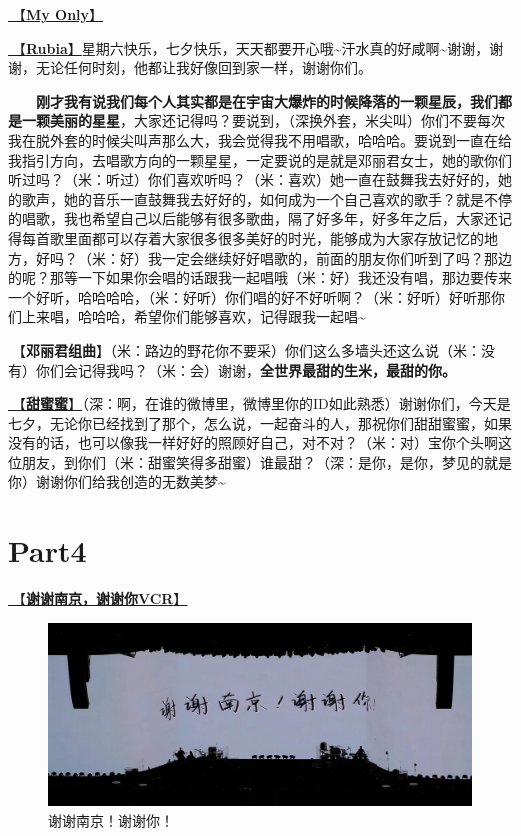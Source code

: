 \documentclass[]{ctexbook}
\begin{document}
\hyperref[my-only]{🎵【\textbf{My Only}】}

\hyperref[rubia]{🎵【\textbf{Rubia}】}星期六快乐，七夕快乐，天天都要开心哦\textasciitilde 汗水真的好咸啊\textasciitilde 谢谢，谢谢，无论任何时刻，他都让我好像回到家一样，谢谢你们。

  \textbf{刚才我有说我们每个人其实都是在宇宙大爆炸的时候降落的一颗星辰，我们都是一颗美丽的星星}，大家还记得吗？要说到，（深换外套，米尖叫）你们不要每次我在脱外套的时候尖叫声那么大，我会觉得我不用唱歌，哈哈哈。要说到一直在给我指引方向，去唱歌方向的一颗星星，一定要说的是就是邓丽君女士，她的歌你们听过吗？（米：听过）你们喜欢听吗？（米：喜欢）她一直在鼓舞我去好好的，她的歌声，她的音乐一直鼓舞我去好好的，如何成为一个自己喜欢的歌手？就是不停的唱歌，我也希望自己以后能够有很多歌曲，隔了好多年，好多年之后，大家还记得每首歌里面都可以存着大家很多很多美好的时光，能够成为大家存放记忆的地方，好吗？（米：好）我一定会继续好好唱歌的，前面的朋友你们听到了吗？那边的呢？那等一下如果你会唱的话跟我一起唱哦（米：好）我还没有唱，那边要传来一个好听，哈哈哈哈，（米：好听）你们唱的好不好听啊？（米：好听）好听那你们上来唱，哈哈哈，希望你们能够喜欢，记得跟我一起唱\textasciitilde{}

🎵【\textbf{邓丽君组曲}】（米：路边的野花你不要采）你们这么多墙头还这么说（米：没有）你们会记得我吗？（米：会）谢谢，\textbf{全世界最甜的生米，最甜的你。}

\hyperref[sweet]{🎵【\textbf{甜蜜蜜}】}（深：啊，在谁的微博里，微博里你的ID如此熟悉）谢谢你们，今天是七夕，无论你已经找到了那个，怎么说，一起奋斗的人，那祝你们甜甜蜜蜜，如果没有的话，也可以像我一样好好的照顾好自己，对不对？（米：对）宝你个头啊这位朋友，到你们（米：甜蜜笑得多甜蜜）谁最甜？（深：是你，是你，梦见的就是你）谢谢你们给我创造的无数美梦\textasciitilde{}

\newpage

\section{Part4}\label{nanjing-20240810-part4}

\hyperref[thank-you-vcr]{🎥【\textbf{谢谢南京，谢谢你VCR}】}

\begin{figure}

{\centering \includegraphics[width=400pt]{img/nanjing20240810/thank-nanjing} 

}

\caption{谢谢南京！谢谢你！}\label{fig:unnamed-chunk-71}
\end{figure}
\end{document}
